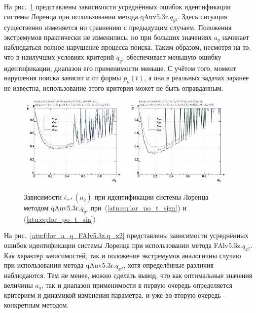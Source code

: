 На рис.~\ref{atu:f:lor_a_q_qAuv5.3r.q_y2} представлены зависимости
усреднённых ошибок идентификации системы Лоренца при использовании метода qAuv5.3r.$q_{y^2}$.
Здесь ситуация существенно изменяется но сравнению с предыдущим случаем.
Положения экстремумов практически не изменились, но
при больших значениях $a_q$ начинает наблюдаться полное нарушение
процесса поиска. Таким образом, несмотря на то,
что в наилучших условиях критерий $q_{y^2}$ обеспечивает меньшую
ошибку идентификации, диапазон его применимости меньше. С учётом
того, момент нарушения поиска зависит и от формы $p_o(t)$,
а она в реальных задачах заранее не известна, использование этого критерия может
не быть оправданным.

\begin{figure}[h!]
  \centerline{
    \includegraphics[width=0.49\textwidth]{p/cha/lor/qAuv5.3r/lor_qAuv5_3r_qy2-p_a_q_e_sign.png}
    \hfill
    \includegraphics[width=0.49\textwidth]{p/cha/lor/qAuv5.3r/lor_qAuv5_3r_qy2-p_a_q_e_sin.png}
  }
  \caption{Зависимости $\overline{e}_{r*}(a_q)$ при идентификации системы Лоренца методом qAuv5.3r.$q_{y^2}$
   при~(\ref{atu:eq:lor_po_t_sign}) и (\ref{atu:eq:lor_po_t_sin})}
  \label{atu:f:lor_a_q_qAuv5.3r.q_y2}
\end{figure}


На рис.~\ref{atu:f:lor_a_q_FAlv5.3z.q_x2} представлены зависимости
усреднённых ошибок идентификации системы Лоренца при использовании метода FAlv5.3z.$q_{x^2}$.
Как характер зависимостей, так и положение экстремумов аналогичны
случаю при использовании метода  qAuv5.3r.$q_{x^2}$,
хотя определённые различия наблюдаются. Тем не менее,
можно сделать вывод, что как оптимальные значения величины $a_q$,
так и диапазон применимости в первую очередь определяется
критерием и динамикой изменения параметра, и уже во вторую очередь --
конкретным методом.


